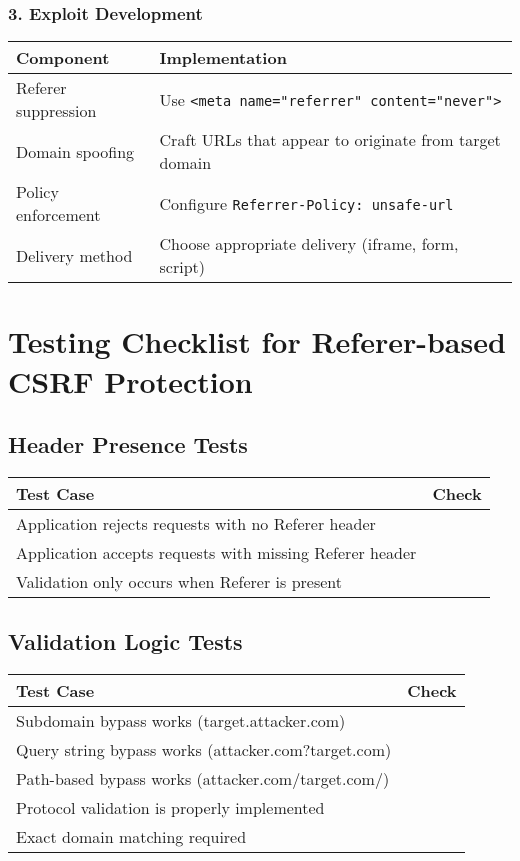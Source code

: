 \documentclass{article}
\begin{document}
\subsubsection*{3. Exploit Development}
\begin{tabular}{>{\raggedright\arraybackslash}p{}>{\raggedright\arraybackslash}p{}}
    \toprule
    \textbf{Component} & \textbf{Implementation} \\
    \midrule
    Referer suppression & Use \texttt{<meta name="referrer" content="never">} \\
    Domain spoofing & Craft URLs that appear to originate from target domain \\
    Policy enforcement & Configure \texttt{Referrer-Policy: unsafe-url} \\
    Delivery method & Choose appropriate delivery (iframe, form, script) \\
    \bottomrule
\end{tabular}

\section*{Testing Checklist for Referer-based CSRF Protection}

\subsection*{Header Presence Tests}
\begin{tabular}{>{\raggedright\arraybackslash}p{}c}
    \toprule
    \textbf{Test Case} & \textbf{Check} \\
    \midrule
    Application rejects requests with no Referer header  \\
    Application accepts requests with missing Referer header  \\
    Validation only occurs when Referer is present \\
    \bottomrule
\end{tabular}

\subsection*{Validation Logic Tests}
\begin{tabular}{>{\raggedright\arraybackslash}p{}c}
    \toprule
    \textbf{Test Case} & \textbf{Check} \\
    \midrule
    Subdomain bypass works (target.attacker.com)  \\
    Query string bypass works (attacker.com?target.com)  \\
    Path-based bypass works (attacker.com/target.com/)  \\
    Protocol validation is properly implemented \\
    Exact domain matching required \\
    \bottomrule
\end{tabular}
\end{document}

